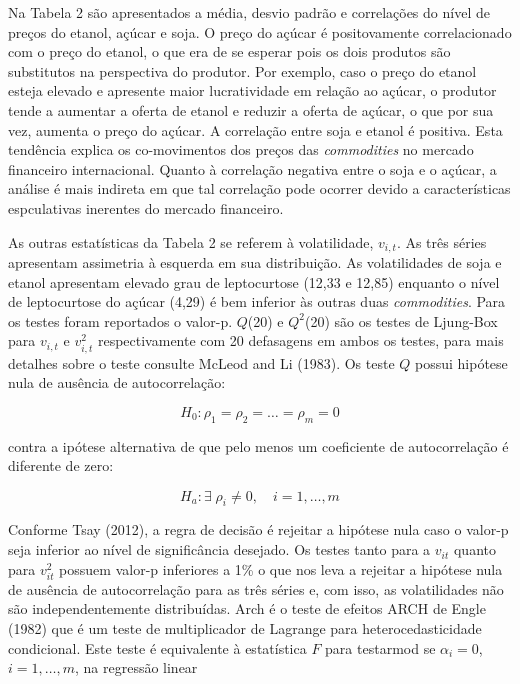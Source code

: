\documentclass[]{article}
\begin{document}
Na Tabela 2 são apresentados a média, desvio padrão e correlações do
nível de preços do etanol, açúcar e soja. O preço do açúcar é
positovamente correlacionado com o preço do etanol, o que era de se
esperar pois os dois produtos são substitutos na perspectiva do
produtor. Por exemplo, caso o preço do etanol esteja elevado e apresente
maior lucratividade em relação ao açúcar, o produtor tende a aumentar a
oferta de etanol e reduzir a oferta de açúcar, o que por sua vez,
aumenta o preço do açúcar. A correlação entre soja e etanol é positiva.
Esta tendência explica os co-movimentos dos preços das
\emph{commodities} no mercado financeiro internacional. Quanto à
correlação negativa entre o soja e o açúcar, a análise é mais indireta
em que tal correlação pode ocorrer devido a características espculativas
inerentes do mercado financeiro.

As outras estatísticas da Tabela 2 se referem à volatilidade,
\(v_{i,t}\). As três séries apresentam assimetria à esquerda em sua
distribuição. As volatilidades de soja e etanol apresentam elevado grau
de leptocurtose (12,33 e 12,85) enquanto o nível de leptocurtose do
açúcar (4,29) é bem inferior às outras duas \emph{commodities}. Para os
testes foram reportados o valor-p. \(Q\)(20) e \(Q^2\)(20) são os testes
de Ljung-Box para \(v_{i,t}\) e \(v_{i,t}^2\) respectivamente com 20
defasagens em ambos os testes, para mais detalhes sobre o teste consulte
McLeod and Li (1983). Os teste \(Q\) possui hipótese nula de ausência de
autocorrelação:

\begin{equation}
 H_0: \rho_1=\rho_2=\ldots=\rho_m=0
 \end{equation}

contra a ipótese alternativa de que pelo menos um coeficiente de
autocorrelação é diferente de zero:

\begin{equation}
H_a:\exists \;\rho_i\neq 0, \quad i =1,\ldots,m
\end{equation}

Conforme Tsay (2012), a regra de decisão é rejeitar a hipótese nula caso
o valor-p seja inferior ao nível de significância desejado. Os testes
tanto para a \(v_{it}\) quanto para \(v_{it}^2\) possuem valor-p
inferiores a 1\% o que nos leva a rejeitar a hipótese nula de ausência
de autocorrelação para as três séries e, com isso, as volatilidades não
são independentemente distribuídas. Arch é o teste de efeitos ARCH de
Engle (1982) que é um teste de multiplicador de Lagrange para
heterocedasticidade condicional. Este teste é equivalente à estatística
\(F\) para testarmod se \(\alpha_i=0\), \(i=1,\ldots,m\), na regressão
linear
\end{document}
